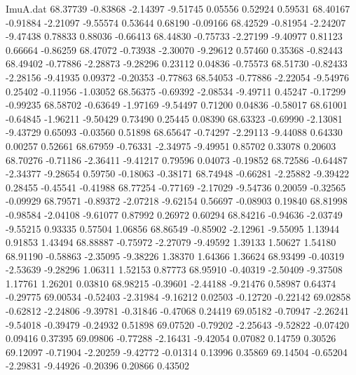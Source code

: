 \begin{filecontents}{ImuA.dat}
  68.37739   -0.83868   -2.14397   -9.51745    0.05556    0.52924    0.59531
  68.40167   -0.91884   -2.21097   -9.55574    0.53644    0.68190   -0.09166
  68.42529   -0.81954   -2.24207   -9.47438    0.78833    0.88036   -0.66413
  68.44830   -0.75733   -2.27199   -9.40977    0.81123    0.66664   -0.86259
  68.47072   -0.73938   -2.30070   -9.29612    0.57460    0.35368   -0.82443
  68.49402   -0.77886   -2.28873   -9.28296    0.23112    0.04836   -0.75573
  68.51730   -0.82433   -2.28156   -9.41935    0.09372   -0.20353   -0.77863
  68.54053   -0.77886   -2.22054   -9.54976    0.25402   -0.11956   -1.03052
  68.56375   -0.69392   -2.08534   -9.49711    0.45247   -0.17299   -0.99235
  68.58702   -0.63649   -1.97169   -9.54497    0.71200    0.04836   -0.58017
  68.61001   -0.64845   -1.96211   -9.50429    0.73490    0.25445    0.08390
  68.63323   -0.69990   -2.13081   -9.43729    0.65093   -0.03560    0.51898
  68.65647   -0.74297   -2.29113   -9.44088    0.64330    0.00257    0.52661
  68.67959   -0.76331   -2.34975   -9.49951    0.85702    0.33078    0.20603
  68.70276   -0.71186   -2.36411   -9.41217    0.79596    0.04073   -0.19852
  68.72586   -0.64487   -2.34377   -9.28654    0.59750   -0.18063   -0.38171
  68.74948   -0.66281   -2.25882   -9.39422    0.28455   -0.45541   -0.41988
  68.77254   -0.77169   -2.17029   -9.54736    0.20059   -0.32565   -0.09929
  68.79571   -0.89372   -2.07218   -9.62154    0.56697   -0.08903    0.19840
  68.81998   -0.98584   -2.04108   -9.61077    0.87992    0.26972    0.60294
  68.84216   -0.94636   -2.03749   -9.55215    0.93335    0.57504    1.06856
  68.86549   -0.85902   -2.12961   -9.55095    1.13944    0.91853    1.43494
  68.88887   -0.75972   -2.27079   -9.49592    1.39133    1.50627    1.54180
  68.91190   -0.58863   -2.35095   -9.38226    1.38370    1.64366    1.36624
  68.93499   -0.40319   -2.53639   -9.28296    1.06311    1.52153    0.87773
  68.95910   -0.40319   -2.50409   -9.37508    1.17761    1.26201    0.03810
  68.98215   -0.39601   -2.44188   -9.21476    0.58987    0.64374   -0.29775
  69.00534   -0.52403   -2.31984   -9.16212    0.02503   -0.12720   -0.22142
  69.02858   -0.62812   -2.24806   -9.39781   -0.31846   -0.47068    0.24419
  69.05182   -0.70947   -2.26241   -9.54018   -0.39479   -0.24932    0.51898
  69.07520   -0.79202   -2.25643   -9.52822   -0.07420    0.09416    0.37395
  69.09806   -0.77288   -2.16431   -9.42054    0.07082    0.14759    0.30526
  69.12097   -0.71904   -2.20259   -9.42772   -0.01314    0.13996    0.35869
  69.14504   -0.65204   -2.29831   -9.44926   -0.20396    0.20866    0.43502

\end{filecontents}
